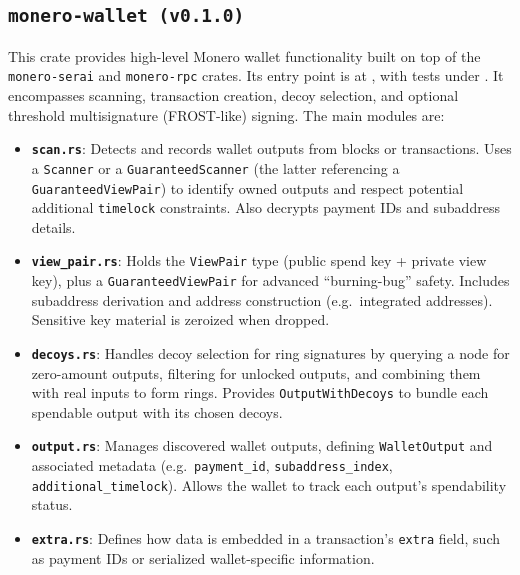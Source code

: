 \documentclass[12pt,a4paper]{article}
\begin{document}
\subsection{\texttt{monero-wallet (v0.1.0)}}
\label{sec:monero-wallet-crate}

This crate provides high-level Monero wallet functionality built on top of the
\texttt{monero-serai} and \texttt{monero-rpc} crates. Its entry point is at
, with tests under . It
encompasses scanning, transaction creation, decoy selection, and optional
threshold multisignature (FROST-like) signing. The main modules are:

\begin{itemize}
    \item \textbf{\texttt{scan.rs}}: Detects and records wallet outputs from
    blocks or transactions. Uses a \texttt{Scanner} or a
    \texttt{GuaranteedScanner} (the latter referencing a
    \texttt{GuaranteedViewPair}) to identify owned outputs and respect potential
    additional \texttt{timelock} constraints. Also decrypts payment IDs and
    subaddress details.

    \item \textbf{\texttt{view\_pair.rs}}: Holds the \texttt{ViewPair} type
    (public spend key + private view key), plus a
    \texttt{GuaranteedViewPair} for advanced “burning-bug” safety. Includes
    subaddress derivation and address construction (e.g.\ integrated addresses).
    Sensitive key material is zeroized when dropped.

    \item \textbf{\texttt{decoys.rs}}: Handles decoy selection for ring
    signatures by querying a node for zero-amount outputs, filtering for
    unlocked outputs, and combining them with real inputs to form rings. Provides
    \texttt{OutputWithDecoys} to bundle each spendable output with its chosen
    decoys.

    \item \textbf{\texttt{output.rs}}: Manages discovered wallet outputs,
    defining \texttt{WalletOutput} and associated metadata (e.g.\ \texttt{payment\_id},
    \texttt{subaddress\_index}, \texttt{additional\_timelock}). Allows the
    wallet to track each output’s spendability status.

    \item \textbf{\texttt{extra.rs}}: Defines how data is embedded in a
    transaction’s \texttt{extra} field, such as payment IDs or serialized
    wallet-specific information.


\end{itemize}
\end{document}
